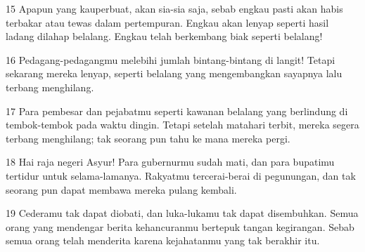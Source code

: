\par 15 Apapun yang kauperbuat, akan sia-sia saja, sebab engkau pasti akan habis terbakar atau tewas dalam pertempuran. Engkau akan lenyap seperti hasil ladang dilahap belalang. Engkau telah berkembang biak seperti belalang!
\par 16 Pedagang-pedagangmu melebihi jumlah bintang-bintang di langit! Tetapi sekarang mereka lenyap, seperti belalang yang mengembangkan sayapnya lalu terbang menghilang.
\par 17 Para pembesar dan pejabatmu seperti kawanan belalang yang berlindung di tembok-tembok pada waktu dingin. Tetapi setelah matahari terbit, mereka segera terbang menghilang; tak seorang pun tahu ke mana mereka pergi.
\par 18 Hai raja negeri Asyur! Para gubernurmu sudah mati, dan para bupatimu tertidur untuk selama-lamanya. Rakyatmu tercerai-berai di pegunungan, dan tak seorang pun dapat membawa mereka pulang kembali.
\par 19 Cederamu tak dapat diobati, dan luka-lukamu tak dapat disembuhkan. Semua orang yang mendengar berita kehancuranmu bertepuk tangan kegirangan. Sebab semua orang telah menderita karena kejahatanmu yang tak berakhir itu.


